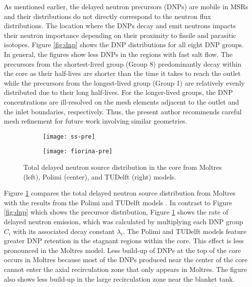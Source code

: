 As mentioned earlier, the delayed neutron precursors (DNPs) are mobile in
\glspl{MSR} and their distributions do not directly correspond to the neutron
flux distributions. The location where the \glspl{DNP} decay and emit neutrons
impacts their neutron
importance depending on their proximity to fissile and parasitic isotopes.
Figure \ref{fig:dnp} shows the \gls{DNP} distributions for all eight \gls{DNP}
groups. In general, the figures show less \glspl{DNP} in the regions with fast
salt flow. The
precursors from the shortest-lived group (Group 8) predominantly decay within
the core as their half-lives are shorter than the time it takes to reach the
outlet while the precursors from the longest-lived group (Group 1) are
relatively evenly distributed due to their long half-lives. For the
longer-lived groups, the \gls{DNP} concentrations are ill-resolved on the
mesh elements adjacent to the outlet and the inlet boundaries, respectively.
Thus, the present author recommends careful mesh refinement for future work
involving similar geometries.

\begin{figure}[b!]
    \centering
    \begin{subfigure}[t]{.30\textwidth}
        \centering
        \vspace{.9cm}
        \texttt{[image: ss-pre]}
    \end{subfigure}
    \begin{subfigure}[t]{.69\textwidth}
        \centering
        \vspace{0pt}
        \texttt{[image: fiorina-pre]}
    \end{subfigure}
    \caption{Total delayed neutron source distribution in the core from
    Moltres (left), Polimi (center), and TUDelft (right) models.}
    \label{fig:pre}
\end{figure}

Figure \ref{fig:pre} compares the total delayed neutron source
distribution from Moltres with the results from the Polimi and TUDelft models
\cite{fiorina_modelling_2014}. In contrast to Figure \ref{fig:dnp} which shows
the precursor distribution, Figure \ref{fig:pre} shows the rate of delayed
neutron emission, which was calculated by multiplying each \gls{DNP} group
$C_i$ with its associated decay constant $\lambda_i$.
The Polimi and TUDelft models
feature greater \gls{DNP} retention in the stagnant regions within the core.
This effect is less pronounced in the Moltres model. Less build-up
of \glspl{DNP} at the top of the core occurs in Moltres because most of the
\glspl{DNP} produced near the center of the core cannot enter the axial
recirculation zone that only appears in Moltres. The figure also shows less
build-up in the large recirculation zone near the blanket tank.

